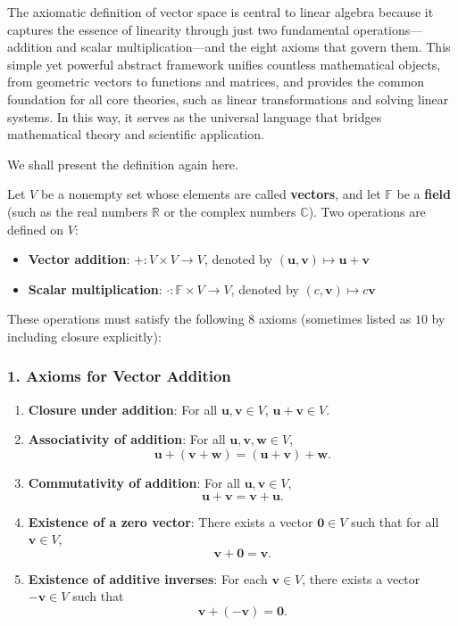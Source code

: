 The axiomatic definition of vector space is central to linear algebra because it captures the essence of linearity through just two fundamental operations—addition and scalar multiplication—and the eight axioms that govern them. This simple yet powerful abstract framework unifies countless mathematical objects, from geometric vectors to functions and matrices, and provides the common foundation for all core theories, such as linear transformations and solving linear systems. In this way, it serves as the universal language that bridges mathematical theory and scientific application.

We shall present the definition again here.

Let $V$ be a nonempty set whose elements are called \textbf{vectors}, and let $\mathbb{F}$ be a \textbf{field} (such as the real numbers $\mathbb{R}$ or the complex numbers $\mathbb{C}$). Two operations are defined on $V$:

\begin{itemize}
    \item \textbf{Vector addition}: $+ : V \times V \to V$, denoted by $(\mathbf{u}, \mathbf{v}) \mapsto \mathbf{u} + \mathbf{v}$
    \item \textbf{Scalar multiplication}: $\cdot : \mathbb{F} \times V \to V$, denoted by $(c, \mathbf{v}) \mapsto c \mathbf{v}$
\end{itemize}

These operations must satisfy the following $8$ axioms (sometimes listed as $10$ by including closure explicitly):

\subsubsection*{1. Axioms for Vector Addition}
\begin{enumerate}
    \item \textbf{Closure under addition}: For all $\mathbf{u}, \mathbf{v} \in V$, $\mathbf{u} + \mathbf{v} \in V$.
    \item \textbf{Associativity of addition}: For all $\mathbf{u}, \mathbf{v}, \mathbf{w} \in V$,
    \[
    \mathbf{u} + (\mathbf{v} + \mathbf{w}) = (\mathbf{u} + \mathbf{v}) + \mathbf{w}.
    \]
    \item \textbf{Commutativity of addition}: For all $\mathbf{u}, \mathbf{v} \in V$,
    \[
    \mathbf{u} + \mathbf{v} = \mathbf{v} + \mathbf{u}.
    \]
    \item \textbf{Existence of a zero vector}: There exists a vector $\mathbf{0} \in V$ such that for all $\mathbf{v} \in V$,
    \[
    \mathbf{v} + \mathbf{0} = \mathbf{v}.
    \]
    \item \textbf{Existence of additive inverses}: For each $\mathbf{v} \in V$, there exists a vector $-\mathbf{v} \in V$ such that
    \[
    \mathbf{v} + (-\mathbf{v}) = \mathbf{0}.
    \]
\end{enumerate}

